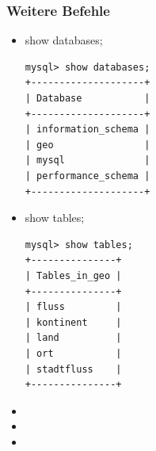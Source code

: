 \subsubsection{Weitere Befehle}
\begin{itemize}
	\item show databases;
	\begin{lstlisting}
mysql> show databases;
+--------------------+
| Database           |
+--------------------+
| information_schema |
| geo                |
| mysql              |
| performance_schema |
+--------------------+
	\end{lstlisting}
	\item show tables;
	\begin{lstlisting}
mysql> show tables;
+---------------+
| Tables_in_geo |
+---------------+
| fluss         |
| kontinent     |
| land          |
| ort           |
| stadtfluss    |
+---------------+
	\end{lstlisting}
	\item 
	\item 
	\item 
\end{itemize}